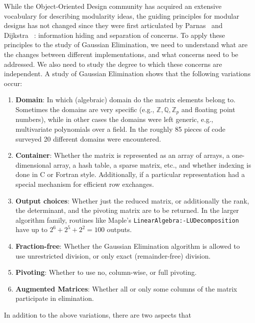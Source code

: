 \documentclass[draft]{elsart}
\begin{document}
While the Object-Oriented Design community has acquired an extensive
vocabulary for describing modularity ideas, the guiding principles for
modular designs has not changed since they were first articulated by
Parnas~\cite{journals/cacm/parnas72a} and Dijkstra~
\cite{EWD:EWD447}: information hiding and separation of concerns.  To
apply these principles to the study of Gaussian Elimination, we need
to understand what are the changes between different implementations, and 
what concerns need to be addressed.  We also need to study the degree
to which these concerns are independent.
A study of Gaussian Elimination \cite{carette04} shows that
the following variations occur:
\begin{enumerate}
    \item \textbf{Domain}: In which (algebraic) domain do the
      matrix elements belong to.  Sometimes the domains are very
      specific (e.g., $\mathbb{Z}, \mathbb{Q}, \mathbb{Z}_p$ and
      floating point numbers), while in other cases the domains
      were left generic, e.g., multivariate polynomials over a
      field.  In the roughly 85 pieces of code surveyed
      \cite{carette04} 20 different domains were encountered.
    \item \textbf{Container}: Whether the matrix is represented as
      an array of arrays, a one-dimensional array, a hash table, a
      sparse matrix, etc., and whether indexing is done in C or
      Fortran style.  Additionally, if a particular representation
      had a special mechanism for efficient row exchanges.
    \item \textbf{Output choices}: Whether just the reduced
      matrix, or additionally the rank, the determinant, and the
      pivoting matrix are to be returned. In the larger algorithm
      family, routines like Maple's
      \texttt{LinearAlgebra:-LUDecomposition} have up to $2^6 +
      2^5 + 2^2 = 100$ outputs.
    \item \textbf{Fraction-free}: Whether the Gaussian Elimination
        algorithm is allowed to use unrestricted division, or only
        exact (remainder-free) division.
    \item \textbf{Pivoting}: Whether to use no, 
        column-wise, or full pivoting.
    \item \textbf{Augmented Matrices}: Whether all or only some
      columns of the matrix participate in elimination.
\end{enumerate}
\noindent In addition to the above variations, there are two aspects that 
\end{document}
